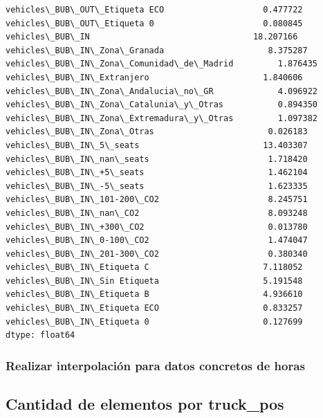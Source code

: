 \documentclass[11pt]{article}
\begin{document}
\begin{Verbatim}[commandchars=\\\{\}]
vehicles\_BUB\_OUT\_Etiqueta ECO                    0.477722
vehicles\_BUB\_OUT\_Etiqueta 0                      0.080845
vehicles\_BUB\_IN                                 18.207166
vehicles\_BUB\_IN\_Zona\_Granada                     8.375287
vehicles\_BUB\_IN\_Zona\_Comunidad\_de\_Madrid         1.876435
vehicles\_BUB\_IN\_Extranjero                       1.840606
vehicles\_BUB\_IN\_Zona\_Andalucia\_no\_GR             4.096922
vehicles\_BUB\_IN\_Zona\_Catalunia\_y\_Otras           0.894350
vehicles\_BUB\_IN\_Zona\_Extremadura\_y\_Otras         1.097382
vehicles\_BUB\_IN\_Zona\_Otras                       0.026183
vehicles\_BUB\_IN\_5\_seats                         13.403307
vehicles\_BUB\_IN\_nan\_seats                        1.718420
vehicles\_BUB\_IN\_+5\_seats                         1.462104
vehicles\_BUB\_IN\_-5\_seats                         1.623335
vehicles\_BUB\_IN\_101-200\_CO2                      8.245751
vehicles\_BUB\_IN\_nan\_CO2                          8.093248
vehicles\_BUB\_IN\_+300\_CO2                         0.013780
vehicles\_BUB\_IN\_0-100\_CO2                        1.474047
vehicles\_BUB\_IN\_201-300\_CO2                      0.380340
vehicles\_BUB\_IN\_Etiqueta C                       7.118052
vehicles\_BUB\_IN\_Sin Etiqueta                     5.191548
vehicles\_BUB\_IN\_Etiqueta B                       4.936610
vehicles\_BUB\_IN\_Etiqueta ECO                     0.833257
vehicles\_BUB\_IN\_Etiqueta 0                       0.127699
dtype: float64
    \end{Verbatim}

    \hypertarget{realizar-interpolaciuxf3n-para-datos-concretos-de-horas}{%
\subsubsection{Realizar interpolación para datos concretos de
horas}\label{realizar-interpolaciuxf3n-para-datos-concretos-de-horas}}

    \hypertarget{cantidad-de-elementos-por-truck_pos}{%
\subsection{Cantidad de elementos por
truck\_pos}\label{cantidad-de-elementos-por-truck_pos}}
\end{document}
